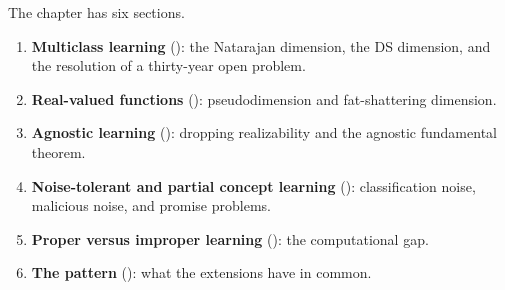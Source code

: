 The chapter has six sections.

\begin{enumerate}[leftmargin=*,itemsep=2pt]
\item \textbf{Multiclass learning} (): the Natarajan
  dimension, the DS dimension, and the resolution of a thirty-year open problem.
\item \textbf{Real-valued functions} ():
  pseudodimension and fat-shattering dimension.
\item \textbf{Agnostic learning} (): dropping realizability
  and the agnostic fundamental theorem.
\item \textbf{Noise-tolerant and partial concept learning}
  (): classification noise, malicious noise,
  and promise problems.
\item \textbf{Proper versus improper learning}
  (): the computational gap.
\item \textbf{The  pattern}
  (): what the extensions have in common.
\end{enumerate}



